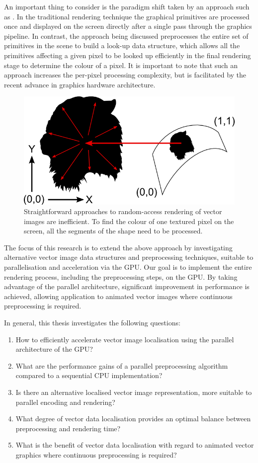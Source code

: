 \documentclass[11pt,a4paper,twoside]{article}
\begin{document}
An important thing to consider is the paradigm shift taken by an approach such as \cite{NehabHoppe08}. In the traditional rendering technique the graphical primitives are processed once and displayed on the screen directly after a single pass through the graphics pipeline. In contrast, the approach being discussed preprocesses the entire set of primitives in the scene to build a look-up data structure, which allows all the primitives affecting a given pixel to be looked up efficiently in the final rendering stage to determine the colour of a pixel. It is important to note that such an approach increases the per-pixel processing complexity, but is facilitated by the recent advance in graphics hardware architecture.

\begin {figure}
	\centering
	\includegraphics[width=0.60\columnwidth] {figures/random_access_vector}
	\caption {Straightforward approaches to random-access rendering of vector images are inefficient. To find the colour of one textured pixel on the screen, all the segments of the shape need to be processed.}
	\label {fig:random_access_vector}
\end {figure}

The focus of this research is to extend the above approach by investigating alternative vector image data structures and preprocessing techniques, suitable to parallelisation and acceleration via the GPU. Our goal is to implement the entire rendering process, including the preprocessing steps, on the GPU. By taking advantage of the parallel architecture, significant improvement in performance is achieved, allowing application to animated vector images where continuous preprocessing is required.

In general, this thesis investigates the following questions:

\begin {enumerate}
\item
How to efficiently accelerate vector image localisation using the parallel architecture of the GPU?
\item
What are the performance gains of a parallel preprocessing algorithm compared to a sequential CPU implementation?
\item
Is there an alternative localised vector image representation, more suitable to parallel encoding and rendering?
\item
What degree of vector data localisation provides an optimal balance between preprocessing and rendering time?
\item
What is the benefit of vector data localisation with regard to animated vector graphics where continuous preprocessing is required?
\end {enumerate}
\end{document}
